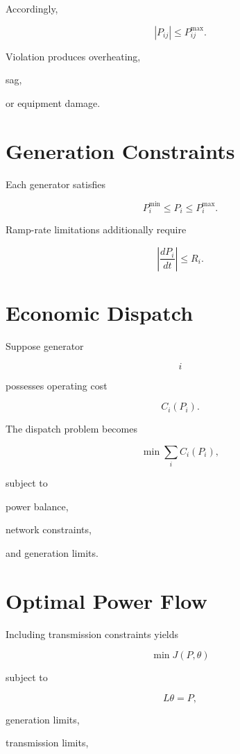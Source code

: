 \documentclass[11pt,fleqn]{book}
\numberwithin{equation}{chapter}
\theoremstyle{plain}
\theoremstyle{definition}
\theoremstyle{remark}
\begin{document}
Accordingly,

\[
|P_{ij}|
\le
P_{ij}^{\max}.
\]

Violation produces overheating,

sag,

or equipment damage.


\section{Generation Constraints}

Each generator satisfies

\[
P_i^{\min}
\le
P_i
\le
P_i^{\max}.
\]

Ramp-rate limitations additionally require

\[
\left|
\frac{dP_i}{dt}
\right|
\le
R_i.
\]


\section{Economic Dispatch}

Suppose generator

\[
i
\]

possesses operating cost

\[
C_i(P_i).
\]

The dispatch problem becomes

\[
\boxed{
\min
\sum_i
C_i(P_i),
}
\]

subject to

power balance,

network constraints,

and generation limits.


\section{Optimal Power Flow}

Including transmission constraints yields

\[
\boxed{
\min
J(P,\theta)
}
\]

subject to

\[
L\theta=P,
\]

generation limits,

transmission limits,
\end{document}
